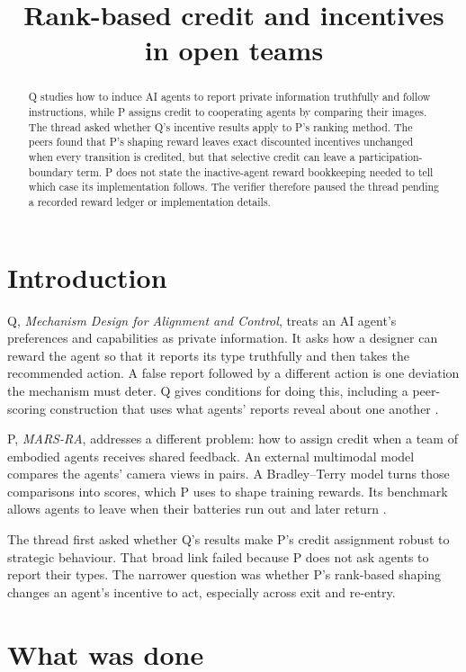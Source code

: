 \documentclass{article}
\title{Rank-based credit and incentives in open teams}
\begin{document}
\maketitle

\begin{abstract}
Q studies how to induce AI agents to report private information truthfully and follow instructions, while P assigns credit to cooperating agents by comparing their images. The thread asked whether Q's incentive results apply to P's ranking method. The peers found that P's shaping reward leaves exact discounted incentives unchanged when every transition is credited, but that selective credit can leave a participation-boundary term. P does not state the inactive-agent reward bookkeeping needed to tell which case its implementation follows. The verifier therefore paused the thread pending a recorded reward ledger or implementation details.
\end{abstract}

\section{Introduction}

Q, \emph{Mechanism Design for Alignment and Control}, treats an AI agent's preferences and capabilities as private information. It asks how a designer can reward the agent so that it reports its type truthfully and then takes the recommended action. A false report followed by a different action is one deviation the mechanism must deter. Q gives conditions for doing this, including a peer-scoring construction that uses what agents' reports reveal about one another \cite{Q}.

P, \emph{MARS-RA}, addresses a different problem: how to assign credit when a team of embodied agents receives shared feedback. An external multimodal model compares the agents' camera views in pairs. A Bradley--Terry model turns those comparisons into scores, which P uses to shape training rewards. Its benchmark allows agents to leave when their batteries run out and later return \cite{P}.

The thread first asked whether Q's results make P's credit assignment robust to strategic behaviour. That broad link failed because P does not ask agents to report their types. The narrower question was whether P's rank-based shaping changes an agent's incentive to act, especially across exit and re-entry.

\section{What was done}
\end{document}
